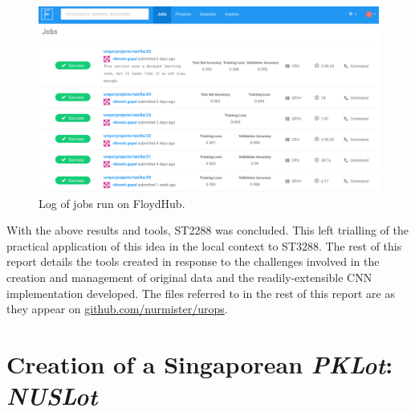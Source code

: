 \documentclass[a4paper, 11pt]{article} %
\begin{document}
    \begin{figure}[H]
    	\centering
    	\includegraphics[width=14cm]{figures/floydhub.png}
    	\caption{Log of jobs run on FloydHub.}
    \end{figure}
	With the above results and tools, ST2288 was concluded. This left trialling of the practical 
	application of this idea in the local context to ST3288. The rest of this 
	report details the tools created in response to the challenges involved in 
	the creation and management of original data and the readily-extensible 
	CNN implementation developed. The files referred to in the rest of this 
	report are as they appear on 
	\hyperlink{https://github.com/nurmister/urops}{github.com/nurmister/urops}.
\section{Creation of a Singaporean \textit{PKLot}: \textit{NUSLot}}
\end{document}
